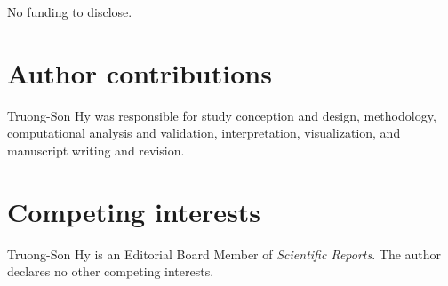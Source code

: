 No funding to disclose.

\section{Author contributions}

Truong-Son Hy was responsible for study conception and design, methodology, computational analysis and validation, interpretation, visualization, and manuscript writing and revision.

\section{Competing interests}

Truong-Son Hy is an Editorial Board Member of \textit{Scientific Reports}. The author declares no other competing interests.

\nolinenumbers



